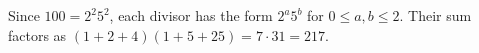 Since $100=2^2 5^2$, each divisor has the form $2^a5^b$ for $0\le a,b\le 2$. Their sum factors as $(1+2+4)(1+5+25)=7\cdot 31=\boxed{217}$.
